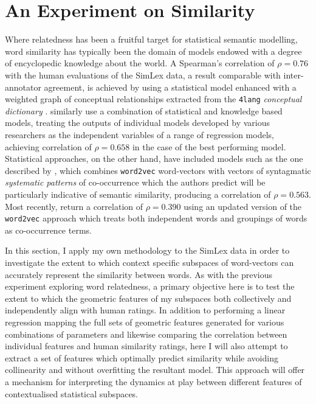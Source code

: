 \section{An Experiment on Similarity}
Where relatedness has been a fruitful target for statistical semantic modelling, word similarity has typically been the domain of models endowed with a degree of encyclopedic knowledge about the world.  A Spearman's correlation of $\rho = 0.76$ with the human evaluations of the SimLex data, a result comparable with inter-annotator agreement, is achieved by \cite{RecskiEA2016} using a statistical model enhanced with a weighted graph of conceptual relationships extracted from the \texttt{4lang} \emph{conceptual dictionary} \citep{KornaiEA2015}.  \cite{BanjadeEA2015} similarly use a combination of statistical and knowledge based models, treating the outputs of individual models developed by various researchers as the independent variables of a range of regression models, achieving correlation of $\rho = 0.658$ in the case of the best performing model.  Statistical approaches, on the other hand, have included models such as the one described by \cite{SchwartzEA2015}, which combines \texttt{word2vec} word-vectors with vectors of syntagmatic \emph{systematic patterns} of co-occurrence which the authors predict will be particularly indicative of semantic similarity, producing a correlation of $\rho = 0.563$.  Most recently, \cite{MaEA2017} return a correlation of $\rho = 0.390$ using an updated version of the \texttt{word2vec} approach which treats both independent words and groupings of words as co-occurrence terms.

In this section, I apply my own methodology to the SimLex data in order to investigate the extent to which context specific subspaces of word-vectors can accurately represent the similarity between words.  As with the previous experiment exploring word relatedness, a primary objective here is to test the extent to which the geometric features of my subspaces both collectively and independently align with human ratings.  In addition to performing a linear regression mapping the full sets of geometric features generated for various combinations of parameters and likewise comparing the correlation between individual features and human similarity ratings, here I will also attempt to extract a set of features which optimally predict similarity while avoiding collinearity and without overfitting the resultant model.  This approach will offer a mechanism for interpreting the dynamics at play between different features of contextualised statistical subspaces.

